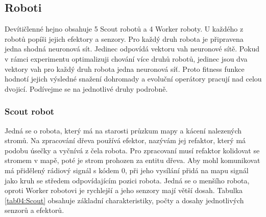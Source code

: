 \subsection{Roboti}
Devítičlenné hejno obsahuje 5 Scout robotů a 4 Worker roboty. U každého z robotů popíši jejich efektory a senzory. Pro každý druh robota je připravena jedna shodná neuronová sít. Jedinec odpovídá vektoru vah neuronové sítě. Pokud v rámci experimentu optimalizuji chování více druhů robotů, jedinec jsou dva vektory vah pro každý druh robota jedna neuronová síť. Proto fitness funkce hodnotí jejich výsledné snažení dohromady a evoluční operátory pracují nad celou dvojicí. Podívejme se na jednotlivé druhy podrobně.
\subsubsection{Scout robot}
Jedná se o robota, který má na starosti průzkum mapy a kácení nalezených stromů. Na zpracování dřeva používá efektor, nazývám jej refaktor, který má podobu úsečky a vyčnívá z čela robota. Pro zpracovaní musí refaktor kolidovat se stromem v mapě, poté je strom prohozen za entitu dřeva. Aby mohl komunikovat má přidělený rádiový signál s kódem 0, při jeho vysílání přidá na mapu signál jako kruh se středem odpovídajícím pozici robota. Jedná se o menšího robota, oproti Worker robotovi je rychlejší a jeho senzory mají větší dosah. Tabulka \ref{tab04:Scout} obsahuje základní charakteristiky, počty a dosahy jednotlivých senzorů a efektorů.
\par 
